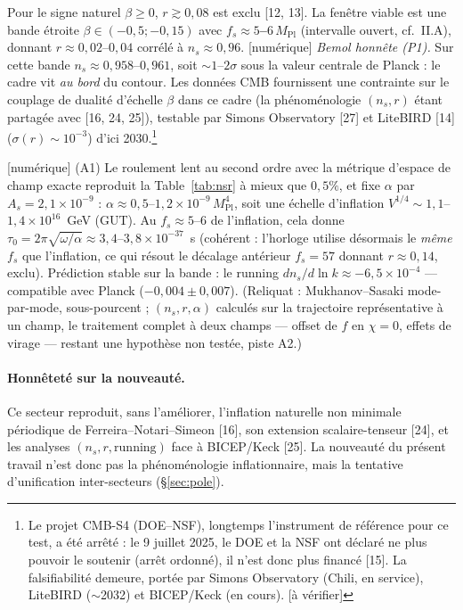 \documentclass[11pt,a4paper]{article}
\newcommand{\statut}[1]{{\footnotesize\textsf{[#1]}}}
\newcommand{\Mpl}{M_{\mathrm{Pl}}}
\theoremstyle{definition}
\begin{document}
Pour le signe naturel $\beta\ge0$, $r\gtrsim0{,}08$ est exclu [12, 13]. La fen\^etre viable est
une bande \'etroite $\beta\in(-0{,}5;-0{,}15)$ avec \textbf{$f_s\approx5$--$6\,\Mpl$}
(intervalle ouvert, cf.\ II.A), donnant $r\approx0{,}02$--$0{,}04$ corr\'el\'e \`a
$n_s\approx0{,}96$. \statut{num\'erique} \emph{Bemol honn\^ete (P1).} Sur cette bande
$n_s\approx0{,}958$--$0{,}961$, soit $\sim1$--$2\sigma$ sous la valeur centrale de Planck : le
cadre vit \emph{au bord} du contour. Les donn\'ees CMB fournissent une contrainte sur le
couplage de dualit\'e d'\'echelle $\beta$ dans ce cadre (la ph\'enom\'enologie $(n_s,r)$ \'etant
partag\'ee avec [16, 24, 25]), testable par Simons Observatory [27] et LiteBIRD [14]
($\sigma(r)\sim10^{-3}$) d'ici 2030.\footnote{Le projet CMB-S4 (DOE--NSF), longtemps
l'instrument de r\'ef\'erence pour ce test, a \'et\'e arr\^et\'e : le 9 juillet 2025, le DOE et la
NSF ont d\'eclar\'e ne plus pouvoir le soutenir (arr\^et ordonn\'e), il n'est donc plus financ\'e
[15]. La falsifiabilit\'e demeure, port\'ee par Simons Observatory (Chili, en service), LiteBIRD
($\sim$2032) et BICEP/Keck (en cours). \statut{\`a v\'erifier}}

\statut{num\'erique} (A1) Le roulement lent au second ordre avec la m\'etrique d'espace de champ
exacte reproduit la Table~\ref{tab:nsr} \`a mieux que $0{,}5\%$, et fixe $\alpha$ par
$A_s=2{,}1\times10^{-9}$ : $\alpha\approx0{,}5$--$1{,}2\times10^{-9}\,\Mpl^4$, soit une \'echelle
d'inflation $V^{1/4}\sim1{,}1$--$1{,}4\times10^{16}$~GeV (GUT). Au $f_s\approx5$--$6$ de
l'inflation, cela donne $\tau_0=2\pi\sqrt{\omega/\alpha}\approx3{,}4$--$3{,}8\times10^{-37}$~s
(coh\'erent : l'horloge utilise d\'esormais le \emph{m\^eme} $f_s$ que l'inflation, ce qui
r\'esout le d\'ecalage ant\'erieur $f_s=57$ donnant $r\approx0{,}14$, exclu). Pr\'ediction stable
sur la bande : le running $dn_s/d\ln k\approx-6{,}5\times10^{-4}$ --- compatible avec Planck
($-0{,}004\pm0{,}007$). (Reliquat : Mukhanov--Sasaki mode-par-mode, sous-pourcent ;
$(n_s,r,\alpha)$ calcul\'es sur la trajectoire repr\'esentative \`a un champ, le traitement
complet \`a deux champs --- offset de $f$ en $\chi=0$, effets de virage --- restant une
hypoth\`ese non test\'ee, piste A2.)

\paragraph{Honn\^etet\'e sur la nouveaut\'e.} Ce secteur reproduit, sans l'am\'eliorer,
l'inflation naturelle non minimale p\'eriodique de Ferreira--Notari--Simeon [16], son extension
scalaire-tenseur [24], et les analyses $(n_s,r,\text{running})$ face \`a BICEP/Keck [25]. La
nouveaut\'e du pr\'esent travail n'est donc pas la ph\'enom\'enologie inflationnaire, mais la
tentative d'unification inter-secteurs (\S\ref{sec:pole}).
\end{document}
